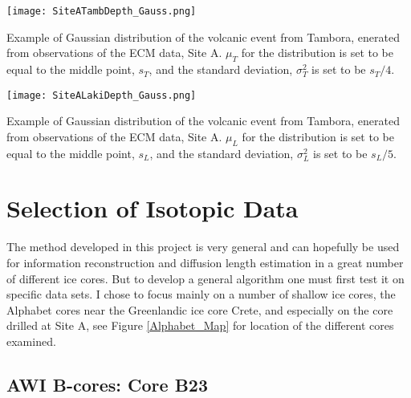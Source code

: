 \documentclass[../../CompleteThesis2/Complete_2ndDraft]{subfiles}
\begin{document}
\begin{marginfigure}
	\centering
	\texttt{[image: SiteATambDepth\_Gauss.png]}
	\caption{\footnotesize Example of Gaussian distribution of the volcanic event from Tambora,  enerated from observations of the ECM data, Site A. $\mu_T$ for the distribution is set to be equal to the middle point, $s_T$, and the standard deviation, $\sigma_T^2$ is set to be $s_T/4$.}
	\label{Fig:DATA_SiteA_TambDepth_Gauss}
\end{marginfigure}


\begin{marginfigure}
	\centering
	\texttt{[image: SiteALakiDepth\_Gauss.png]}
	\caption{\footnotesize Example of Gaussian distribution of the volcanic event from Tambora,  enerated from observations of the ECM data, Site A. $\mu_L$ for the distribution is set to be equal to the middle point, $s_L$, and the standard deviation, $\sigma_L^2$ is set to be $s_L/5$.}
	\label{Fig:DATA_SiteA_LakiDepth_Gauss}
\end{marginfigure}



\section[Selection][Selection]{Selection of Isotopic Data}
\label{Sec:Data_Selection}


The method developed in this project is very general and can hopefully be used for information reconstruction and diffusion length estimation in a great number of different ice cores. But to develop a general algorithm one must first test it on specific data sets. I chose to focus mainly on a number of shallow ice cores, the Alphabet cores near the Greenlandic ice core Crete, and especially on the core drilled at Site A, see Figure \ref{Alphabet_Map} for location of the different cores examined.

\subsection[AWI B-cores]{AWI B-cores: Core B23}
\label{Subsec:Data_Selection_Bcores}
\end{document}

